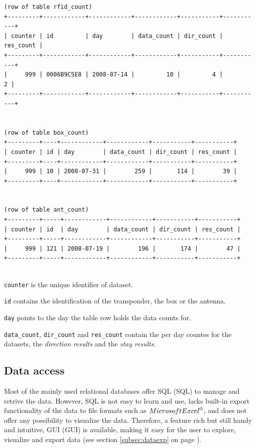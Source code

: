 \codescript
\begin{lstlisting}[frame=none]
(row of table rfid_count)
+---------+------------+------------+------------+-----------+-----------+
| counter | id         | day        | data_count | dir_count | res_count |
+---------+------------+------------+------------+-----------+-----------+
|     999 | 0006B9C5E8 | 2008-07-14 |         10 |         4 |         2 | 
+---------+------------+------------+------------+-----------+-----------+


(row of table box_count)
+---------+----+------------+------------+-----------+-----------+
| counter | id | day        | data_count | dir_count | res_count |
+---------+----+------------+------------+-----------+-----------+
|     999 | 10 | 2008-07-31 |        259 |       114 |        39 | 
+---------+----+------------+------------+-----------+-----------+


(row of table ant_count)
+---------+-----+------------+------------+-----------+-----------+
| counter | id  | day        | data_count | dir_count | res_count |
+---------+-----+------------+------------+-----------+-----------+
|     999 | 121 | 2008-07-19 |        196 |       174 |        47 | 
+---------+-----+------------+------------+-----------+-----------+


\end{lstlisting}

\begin{mydesc}
	\item \lstinline|counter| is the unique identifier of dataset.
	\item \lstinline|id| contains the identification of the transponder, the box or the antenna.
	\item \lstinline|day| points to the day the table row holds the data counts for.
	\item \lstinline|data_count|, \lstinline|dir_count| and \lstinline|res_count| contain the per day countes for the datasets, the \textit{direction results} and the \textit{stay results}.
\end{mydesc}

\subsection{Data access}
\label{subsec:dataccess}

Most of the mainly used relational databases offer \ac{SQL} (SQL) to manage and retrive the data. However, SQL is not easy to learn and use, lacks built-in export functionality of the data to file formats such as $Microsoft Excel^{\copyright}$, and does not offer any possibility to visualize the data. Therefore, a feature rich but still handy and intuitive, \ac{GUI} (GUI) is available, making it easy for the user to explore, visualize and export data (see section \ref{subsec:dataexp} on page \pageref{subsec:dataexp}).